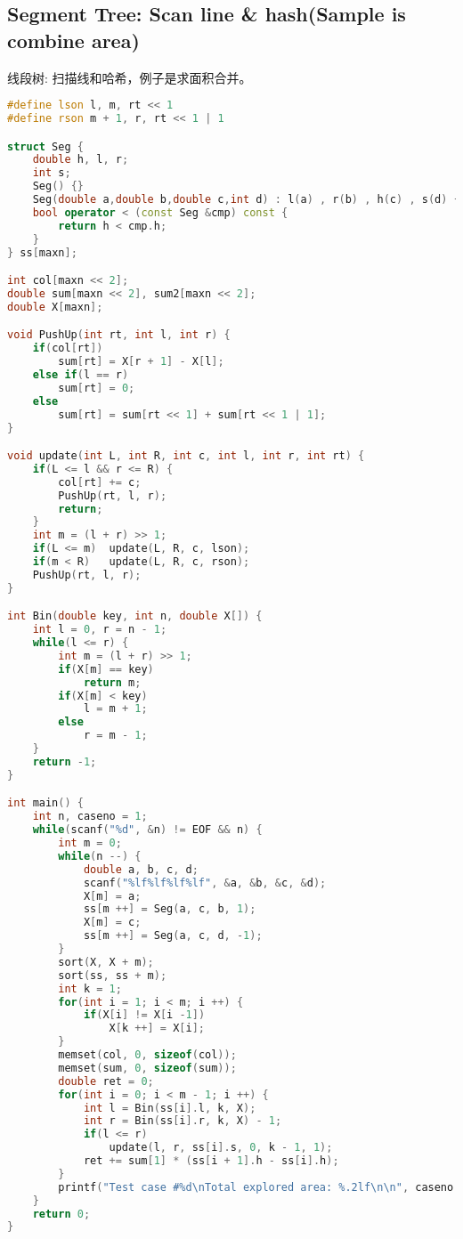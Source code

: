 \subsection{Segment Tree: Scan line & hash(Sample is combine area)}
    线段树: 扫描线和哈希，例子是求面积合并。
    \begin{lstlisting}[language=c++]
#define lson l, m, rt << 1
#define rson m + 1, r, rt << 1 | 1

struct Seg {
    double h, l, r;
    int s; 
    Seg() {}
    Seg(double a,double b,double c,int d) : l(a) , r(b) , h(c) , s(d) {}
	bool operator < (const Seg &cmp) const {
		return h < cmp.h;
	}
} ss[maxn];

int col[maxn << 2];
double sum[maxn << 2], sum2[maxn << 2];
double X[maxn];

void PushUp(int rt, int l, int r) {
    if(col[rt])
        sum[rt] = X[r + 1] - X[l];
    else if(l == r)
        sum[rt] = 0;
    else
        sum[rt] = sum[rt << 1] + sum[rt << 1 | 1];
}

void update(int L, int R, int c, int l, int r, int rt) {
    if(L <= l && r <= R) {
        col[rt] += c;
        PushUp(rt, l, r);
        return;
    }
    int m = (l + r) >> 1;
    if(L <= m)  update(L, R, c, lson);
    if(m < R)   update(L, R, c, rson);
    PushUp(rt, l, r);
}

int Bin(double key, int n, double X[]) {
    int l = 0, r = n - 1;
    while(l <= r) {
        int m = (l + r) >> 1;
        if(X[m] == key) 
            return m;
        if(X[m] < key)  
            l = m + 1;
        else
            r = m - 1;
    }
    return -1;
}

int main() {
    int n, caseno = 1;
    while(scanf("%d", &n) != EOF && n) {
        int m = 0;
        while(n --) {
            double a, b, c, d;
            scanf("%lf%lf%lf%lf", &a, &b, &c, &d);
            X[m] = a;
            ss[m ++] = Seg(a, c, b, 1);
            X[m] = c;
            ss[m ++] = Seg(a, c, d, -1);
        }
        sort(X, X + m);
        sort(ss, ss + m);
        int k = 1;
        for(int i = 1; i < m; i ++) {
            if(X[i] != X[i -1])
                X[k ++] = X[i];
        }
        memset(col, 0, sizeof(col));
        memset(sum, 0, sizeof(sum));
        double ret = 0;
        for(int i = 0; i < m - 1; i ++) {
            int l = Bin(ss[i].l, k, X);
            int r = Bin(ss[i].r, k, X) - 1;
            if(l <= r)
                update(l, r, ss[i].s, 0, k - 1, 1);
            ret += sum[1] * (ss[i + 1].h - ss[i].h);
        }
        printf("Test case #%d\nTotal explored area: %.2lf\n\n", caseno ++, ret);
    }
    return 0;
}
    \end{lstlisting}
